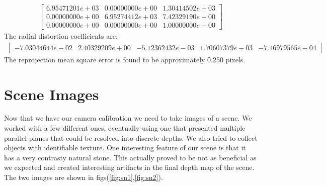 \documentclass[a4paper]{article}
\begin{document}
\begin{align*}
	\begin{bmatrix}
             6.95471201e+03 & 0.00000000e+00  & 1.30414502e+03\\
            0.00000000e+00  & 6.95274412e+03  & 7.42329190e+00\\
            0.00000000e+00  & 0.00000000e+00  & 1.00000000e+00
         \end{bmatrix}
\end{align*}
The radial distortion coefficients are:
\begin{align*}
	\begin{bmatrix}
		-7.03044644e-02 & 2.40329209e+00 &  -5.12362432e-03 & 1.70607379e-03  &  -7.16979565e-04
	\end{bmatrix}
 \end{align*}
 The reprojection mean square error is found to be approximately 0.250 pixels.
 \FloatBarrier

\section{Scene Images}
Now that we have our camera calibration we need to take images of a scene.  We worked with a few different ones, eventually using one that presented multiple parallel planes that could be resolved into discrete depths.  We also tried to collect objects with identifiable texture.  One interesting feature of our scene is that it has a very contrasty natural stone. This actually proved to be not as beneficial as we expected and created interesting artifacts in the final depth map of the scene.  The two images are shown in figs(\ref{fig:sn1},\ref{fig:sn2}).
\end{document}
